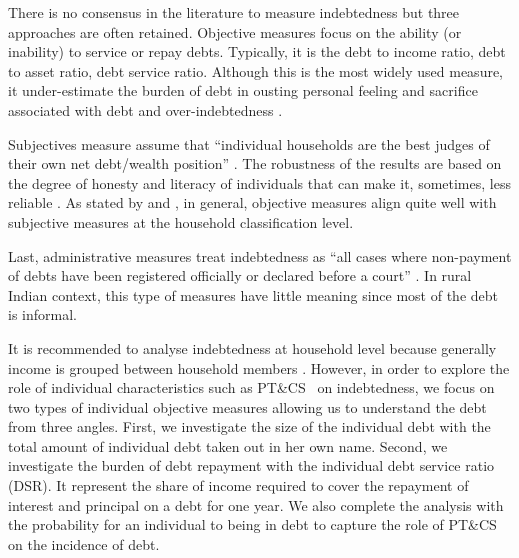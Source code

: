 \documentclass[a4paper, 11pt, onecolumn]{article}
\newcommand{\PTCS}{PT\&CS}
\begin{document}
There is no consensus in the literature to measure indebtedness but three approaches are often retained.
Objective measures focus on the ability (or inability) to service or repay debts.
Typically, it is the debt to income ratio, debt to asset ratio, debt service ratio.
Although this is the most widely used measure, it under-estimate the burden of debt in ousting personal feeling and sacrifice associated with debt and over-indebtedness \citep{Betti2007}.
 
Subjectives measure assume that ``individual households are the best judges of their own net debt/wealth position'' \citep{Betti2007}.
The robustness of the results are based on the degree of honesty and literacy of individuals that can make it, sometimes, less reliable \citep{DAlessio2013}.
As stated by \cite{Rinaldi2006} and \cite{Keese2012}, in general, objective measures align quite well with subjective measures at the household classification level.

Last, administrative measures treat indebtedness  as ``all cases where non-payment of debts have been registered officially or declared before a court'' \citep{Betti2007}.
In rural Indian context, this type of measures have little meaning since most of the debt is informal.


It is recommended to analyse indebtedness at household level because generally income is grouped between household members \citep{European2010}.
However, in order to explore the role of individual characteristics such as \PTCS~ on indebtedness, we focus on two types of individual objective measures allowing us to understand the debt from three angles.
First, we investigate the size of the individual debt with the total amount of individual debt taken out in her own name.
Second, we investigate the burden of debt repayment with the individual debt service ratio (DSR).
It represent the share of income required to cover the repayment of interest and principal on a debt for one year.
We also complete the analysis with the probability for an individual to being in debt to capture the role of \PTCS~ on the incidence of debt.

\end{document}
